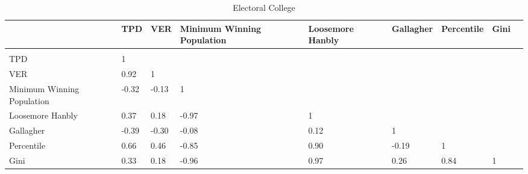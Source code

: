 
\begin{landscape}

\begin{table}[!htbp] \centering 
  \caption{Electoral College} 
  \label{tab:cor_ec} 
\begin{tabular}{C{2.5cm}p{1.75cm}p{1.75cm}p{1.75cm}p{1.75cm}p{1.75cm}p{1.75cm}p{1.75cm}p{1.75cm}}
{} & {TPD} & {VER} & {Minimum Winning Population} & {Loosemore Hanbly} & {Gallagher} & {Percentile} & {Gini} \\ 
\hline \\[-1.8ex] 
{TPD} & 1 &  &  &  &  &  &  \\ 
{VER} & 0.92 & 1 &  &  &  &  &  \\ 
{Minimum Winning Population} & -0.32 & -0.13 & 1 &  &  &  &  \\ 
{Loosemore Hanbly} & 0.37 & 0.18 & -0.97 & 1 &  &  &  \\ 
{Gallagher} & -0.39 & -0.30 & -0.08 & 0.12 & 1 &  &  \\ 
{Percentile} & 0.66 & 0.46 & -0.85 & 0.90 & -0.19 & 1 &  \\ 
{Gini} & 0.33 & 0.18 & -0.96 & 0.97 & 0.26 & 0.84 & 1 \\ 
\end{tabular}
\tabnotes{}
\end{table}

\end{landscape}
 
